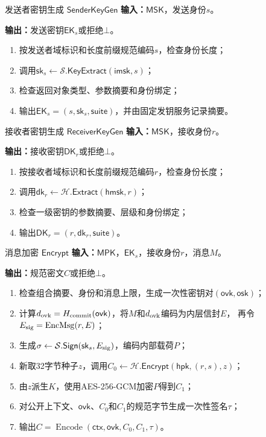 \begin{ibmealgorithm}{发送者密钥生成 $\mathsf{SenderKeyGen}$}
\label{alg:sender-keygen}
\textbf{输入：}$\mathsf{MSK}$，发送身份$s$。\par
\textbf{输出：}发送密钥$\mathsf{EK}_s$或拒绝$\bot$。
\begin{enumerate}
  \item 按发送者域标识和长度前缀规范编码$s$，检查身份长度；
  \item 调用$\mathsf{sk}_s\leftarrow\mathcal S.\mathsf{KeyExtract}(\mathsf{imsk},s)$；
  \item 检查返回对象类型、参数摘要和身份绑定；
  \item 输出$\mathsf{EK}_s=(s,\mathsf{sk}_s,\mathsf{suite})$，并由固定发钥服务记录摘要。
\end{enumerate}
\end{ibmealgorithm}

\begin{ibmealgorithm}{接收者密钥生成 $\mathsf{ReceiverKeyGen}$}
\label{alg:receiver-keygen}
\textbf{输入：}$\mathsf{MSK}$，接收身份$r$。\par
\textbf{输出：}接收密钥$\mathsf{DK}_r$或拒绝$\bot$。
\begin{enumerate}
  \item 按接收者域标识和长度前缀规范编码$r$，检查身份长度；
  \item 调用$\mathsf{dk}_r\leftarrow\mathcal H.\mathsf{Extract}(\mathsf{hmsk},r)$；
  \item 检查一级密钥的参数摘要、层级和身份绑定；
  \item 输出$\mathsf{DK}_r=(r,\mathsf{dk}_r,\mathsf{suite})$。
\end{enumerate}
\end{ibmealgorithm}

\begin{ibmealgorithm}{消息加密 $\mathsf{Encrypt}$}
\label{alg:encrypt}
\textbf{输入：}$\mathsf{MPK}$，$\mathsf{EK}_s$，接收身份$r$，消息$M$。\par
\textbf{输出：}规范密文$C$或拒绝$\bot$。
\begin{enumerate}
  \item 检查组合摘要、身份和消息上限，生成一次性密钥对$(\mathsf{ovk},\mathsf{osk})$；
  \item 计算$d_{\rm ovk}=H_{\rm commit}(\mathsf{ovk})$，将$M$和$d_{\rm ovk}$编码为内层信封$E$，
        再令$E_{\rm sig}=\operatorname{EncMsg}(r,E)$；
  \item 生成$\sigma\leftarrow\mathcal S.\mathsf{Sign}(\mathsf{sk}_s,E_{\rm sig})$，编码内部载荷$P$；
  \item 新取32字节种子$z$，调用$C_0\leftarrow\mathcal H.\mathsf{Encrypt}
        (\mathsf{hpk},(r,s),z)$；
  \item 由$z$派生$K$，使用AES-256-GCM加密$P$得到$C_1$；
  \item 对公开上下文、$\mathsf{ovk}$、$C_0$和$C_1$的规范字节生成一次性签名$\tau$；
  \item 输出$C=\operatorname{Encode}(\mathsf{ctx},\mathsf{ovk},C_0,C_1,\tau)$。
\end{enumerate}
\end{ibmealgorithm}

